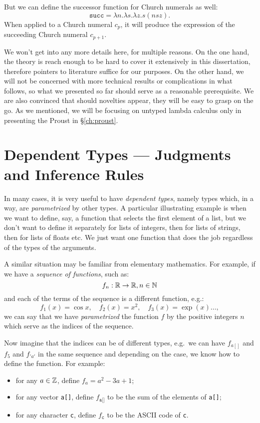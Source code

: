 But we can define the successor function for Church numerals as well:
\[
  \texttt{succ} = \lambda n . \lambda s . \lambda z . s (n s z).
\]
When applied to a Church numeral $ c_p $, it will produce the expression
of the succeeding Church numeral $ c_{p + 1} $.

We won't get into any more details here, for multiple reasons. On the
one hand, the theory is reach enough to be hard to cover it extensively
in this dissertation, therefore pointers to literature suffice for our
purposes. On the other hand, we will not be concerned with more technical
results or complications in what follows, so what we presented so far
should serve as a reasonable prerequisite. We are also convinced that
should novelties appear, they will be easy to grasp on the go.
As we mentioned, we will be focusing on untyped lambda calculus only in
presenting the Proust  in \S\ref{ch:proust}.

\section{Dependent Types --- Judgments and Inference Rules}
\label{sec:depty}

In many cases, it is very useful to have \emph{dependent types}, namely
types which, in a way, are \emph{parametrized} by other types. A particular
illustrating example is when we want to define, say, a function that selects
the first element of a list, but we don't want to define it separately
for lists of integers, then for lists of strings, then for lists of floats
etc. We just want one function that does the job regardless of the types
of the arguments.

A similar situation may be familiar from elementary mathematics. For example,
if we have a \emph{sequence of functions}, such as:
\[
  f_n : \mathbb{R} \to \mathbb{R}, n \in \mathbb{N}
\]
and each of the terms of the sequence is a different function, e.g.:
\[
  f_1(x) = \cos x, \quad f_2(x) = x^2, \quad f_3(x) = \exp(x) \dots,
\]
we can say that we have \emph{parametrized} the function $ f $ by
the positive integers $ n $ which serve as the indices of the sequence.

Now imagine that the indices can be of different types, e.g.\ we can
have $ f_{a[]} $ and $ f_5 $ and $ f_{'a'} $ in the same sequence and depending
on the case, we know how to define the function. For example:
\begin{itemize}
\item for any $ a \in \mathbb{Z} $, define $ f_a = a^2 - 3a + 1 $;
\item for any vector \texttt{a[]}, define $ f_{\texttt{a[]}} $ to be the sum
  of the elements of \texttt{a[]};
\item for any character \texttt{c}, define $ f_{\texttt{c}} $ to be the ASCII code
  of \texttt{c}.
\end{itemize}

